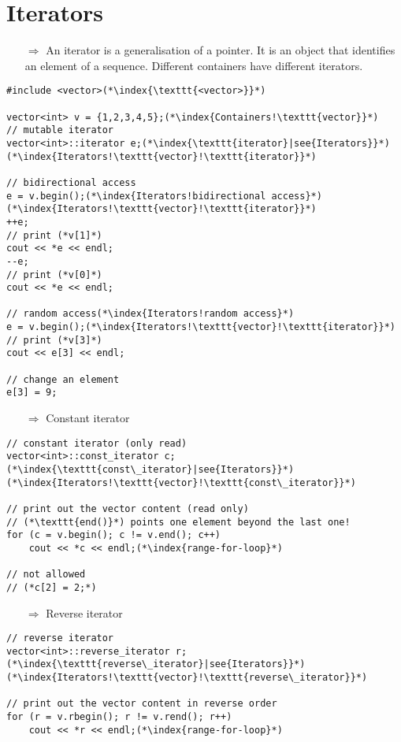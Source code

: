 \documentclass[10pt]{article}
\begin{document}
\section{Iterators}
\small
\begin{enumerate}
\item[$\Rightarrow$] An iterator is a generalisation of a pointer. It is an object that identifies an element of a sequence. Different containers have
different iterators.
\end{enumerate}
\begin{lstlisting}
#include <vector>(*\index{\texttt{<vector>}}*)

vector<int> v = {1,2,3,4,5};(*\index{Containers!\texttt{vector}}*)
// mutable iterator
vector<int>::iterator e;(*\index{\texttt{iterator}|see{Iterators}}*)(*\index{Iterators!\texttt{vector}!\texttt{iterator}}*)

// bidirectional access
e = v.begin();(*\index{Iterators!bidirectional access}*)(*\index{Iterators!\texttt{vector}!\texttt{iterator}}*)
++e;
// print (*v[1]*)
cout << *e << endl;
--e;
// print (*v[0]*)
cout << *e << endl;

// random access(*\index{Iterators!random access}*)
e = v.begin();(*\index{Iterators!\texttt{vector}!\texttt{iterator}}*)
// print (*v[3]*)
cout << e[3] << endl;

// change an element
e[3] = 9;
\end{lstlisting}
\begin{enumerate}
\item[$\Rightarrow$] Constant iterator
\end{enumerate}
\begin{lstlisting}
// constant iterator (only read)
vector<int>::const_iterator c;(*\index{\texttt{const\_iterator}|see{Iterators}}*)(*\index{Iterators!\texttt{vector}!\texttt{const\_iterator}}*)

// print out the vector content (read only)
// (*\texttt{end()}*) points one element beyond the last one!
for (c = v.begin(); c != v.end(); c++)
    cout << *c << endl;(*\index{range-for-loop}*)

// not allowed
// (*c[2] = 2;*)
\end{lstlisting}
\begin{enumerate}
\item[$\Rightarrow$] Reverse iterator
\end{enumerate}
\begin{lstlisting}
// reverse iterator
vector<int>::reverse_iterator r;(*\index{\texttt{reverse\_iterator}|see{Iterators}}*)(*\index{Iterators!\texttt{vector}!\texttt{reverse\_iterator}}*)

// print out the vector content in reverse order
for (r = v.rbegin(); r != v.rend(); r++)
    cout << *r << endl;(*\index{range-for-loop}*)
\end{lstlisting}
\end{document}
